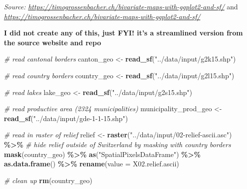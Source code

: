 \documentclass[
]{article}
\newenvironment{Shaded}{\begin{snugshade}}{\end{snugshade}}
\newcommand{\AttributeTok}[1]{\textcolor[rgb]{0.13,0.29,0.53}{#1}}
\newcommand{\CommentTok}[1]{\textcolor[rgb]{0.56,0.35,0.01}{\textit{#1}}}
\newcommand{\FunctionTok}[1]{\textcolor[rgb]{0.13,0.29,0.53}{\textbf{#1}}}
\newcommand{\NormalTok}[1]{#1}
\newcommand{\OtherTok}[1]{\textcolor[rgb]{0.56,0.35,0.01}{#1}}
\newcommand{\SpecialCharTok}[1]{\textcolor[rgb]{0.81,0.36,0.00}{\textbf{#1}}}
\newcommand{\StringTok}[1]{\textcolor[rgb]{0.31,0.60,0.02}{#1}}
\begin{document}
\emph{Source:
\url{https://timogrossenbacher.ch/bivariate-maps-with-ggplot2-and-sf/}}
and
\emph{\url{https://timogrossenbacher.ch/bivariate-maps-with-ggplot2-and-sf/}}

\textbf{I did not create any of this, just FYI! it's a streamlined
version from the source website and repo}

\begin{Shaded}
\begin{Highlighting}[]
\CommentTok{\# read cantonal borders}
\NormalTok{canton\_geo }\OtherTok{\textless{}{-}} \FunctionTok{read\_sf}\NormalTok{(}\StringTok{"../data/input/g2k15.shp"}\NormalTok{)}

\CommentTok{\# read country borders}
\NormalTok{country\_geo }\OtherTok{\textless{}{-}} \FunctionTok{read\_sf}\NormalTok{(}\StringTok{"../data/input/g2l15.shp"}\NormalTok{)}

\CommentTok{\# read lakes}
\NormalTok{lake\_geo }\OtherTok{\textless{}{-}} \FunctionTok{read\_sf}\NormalTok{(}\StringTok{"../data/input/g2s15.shp"}\NormalTok{)}

\CommentTok{\# read productive area (2324 municipalities)}
\NormalTok{municipality\_prod\_geo }\OtherTok{\textless{}{-}} \FunctionTok{read\_sf}\NormalTok{(}\StringTok{"../data/input/gde{-}1{-}1{-}15.shp"}\NormalTok{)}

\CommentTok{\# read in raster of relief}
\NormalTok{relief }\OtherTok{\textless{}{-}} \FunctionTok{raster}\NormalTok{(}\StringTok{"../data/input/02{-}relief{-}ascii.asc"}\NormalTok{) }\SpecialCharTok{\%\textgreater{}\%}
  \CommentTok{\# hide relief outside of Switzerland by masking with country borders}
  \FunctionTok{mask}\NormalTok{(country\_geo) }\SpecialCharTok{\%\textgreater{}\%}
  \FunctionTok{as}\NormalTok{(}\StringTok{"SpatialPixelsDataFrame"}\NormalTok{) }\SpecialCharTok{\%\textgreater{}\%}
  \FunctionTok{as.data.frame}\NormalTok{() }\SpecialCharTok{\%\textgreater{}\%}
  \FunctionTok{rename}\NormalTok{(}\AttributeTok{value =} \StringTok{\textasciigrave{}}\AttributeTok{X02.relief.ascii}\StringTok{\textasciigrave{}}\NormalTok{)}

\CommentTok{\# clean up}
\FunctionTok{rm}\NormalTok{(country\_geo)}
\end{Highlighting}
\end{Shaded}
\end{document}
